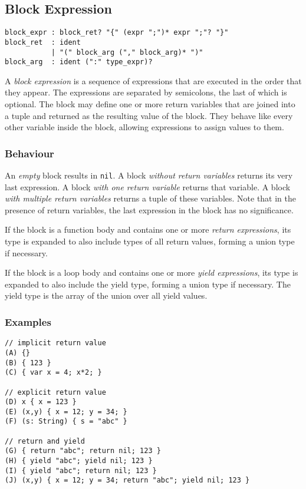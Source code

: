 \subsection{Block Expression}

\begin{lstlisting}[language=EBNF]
block_expr : block_ret? "{" (expr ";")* expr ";"? "}"
block_ret  : ident
           | "(" block_arg ("," block_arg)* ")"
block_arg  : ident (":" type_expr)?
\end{lstlisting}

A \emph{block expression} is a sequence of expressions that are executed in the
order that they appear. The expressions are separated by semicolons, the last of
which is optional. The block may define one or more return variables that are
joined into a tuple and returned as the resulting value of the block. They
behave like every other variable inside the block, allowing expressions to
assign values to them.

\subsubsection{Behaviour}

An \emph{empty} block results in \lstinline{nil}. A block \emph{without return
variables} returns its very last expression. A block \emph{with one return
variable} returns that variable. A block \emph{with multiple return variables}
returns a tuple of these variables. Note that in the presence of return
variables, the last expression in the block has no significance.

If the block is a function body and contains one or more \emph{return
expressions}, its type is expanded to also include types of all return values,
forming a union type if necessary.

If the block is a loop body and contains one or more \emph{yield expressions},
its type is expanded to also include the yield type, forming a union type if
necessary. The yield type is the array of the union over all yield values.

\subsubsection{Examples}

\begin{lstlisting}
// implicit return value
(A) {}
(B) { 123 }
(C) { var x = 4; x*2; }

// explicit return value
(D) x { x = 123 }
(E) (x,y) { x = 12; y = 34; }
(F) (s: String) { s = "abc" }

// return and yield
(G) { return "abc"; return nil; 123 }
(H) { yield "abc"; yield nil; 123 }
(I) { yield "abc"; return nil; 123 }
(J) (x,y) { x = 12; y = 34; return "abc"; yield nil; 123 }
\end{lstlisting}

